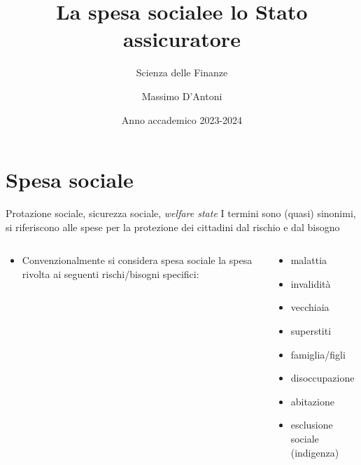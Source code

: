 \documentclass[aspectratio=149,11pt]{beamer}
\institute{Università di Siena}
\author{Massimo D'Antoni}
\date{Anno accademico 2023-2024}
\title{La spesa sociale\newline e lo Stato assicuratore}
\subtitle{Scienza delle Finanze}
\begin{document}
\maketitle

\section{Spesa sociale}

\begin{frame}{Protazione sociale, sicurezza sociale, \emph{welfare state}}
I termini sono (quasi) sinonimi, si riferiscono alle spese per la protezione
dei cittadini dal rischio e dal bisogno
\vspace{-3mm}

\begin{columns}
\begin{column}[t]{0.4\columnwidth}
\begin{itemize}
\item Convenzionalmente si considera spesa sociale la spesa rivolta ai seguenti rischi/bisogni specifici:
\end{itemize}
\end{column}

\begin{column}[t]{.58\columnwidth}
\begin{itemize}
\item malattia
\item invalidità
\item vecchiaia
\item superstiti
\item famiglia/figli
\item disoccupazione
\item abitazione
\item esclusione sociale (indigenza)
\end{itemize}
\end{column}
\end{columns}
\end{frame}
\end{document}
